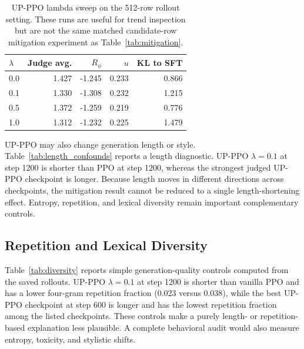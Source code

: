 \documentclass[11pt]{article}
\newcommand{\Rphi}{R_{\phi}}
\begin{document}
\begin{table}[!tbp]
\centering
\scriptsize
\caption{UP-PPO lambda sweep on the 512-row rollout setting. These runs are useful for trend inspection but are not the same matched candidate-row mitigation experiment as Table~\ref{tab:mitigation}.}
\label{tab:lambda_curve}
\begin{tabular}{lrrrr}
\toprule
$\lambda$ & Judge avg. & $\Rphi$ & $u$ & KL to SFT \\
\midrule
0.0 & 1.427 & -1.245 & 0.233 & 0.866 \\
0.1 & 1.330 & -1.308 & 0.232 & 1.215 \\
0.5 & 1.372 & -1.259 & 0.219 & 0.776 \\
1.0 & 1.312 & -1.232 & 0.225 & 1.479 \\
\bottomrule
\end{tabular}
\end{table}

UP-PPO may also change generation length or style. Table~\ref{tab:length_confounds} reports a length diagnostic. UP-PPO $\lambda=0.1$ at step 1200 is shorter than PPO at step 1200, whereas the strongest judged UP-PPO checkpoint is longer. Because length moves in different directions across checkpoints, the mitigation result cannot be reduced to a single length-shortening effect. Entropy, repetition, and lexical diversity remain important complementary controls.

\begin{table}[!tbp]
\centering
\tiny
\caption{Generated-response length diagnostics for selected 64-row checkpoints.}
\label{tab:length_confounds}
\end{table}



\subsection{Repetition and Lexical Diversity}
Table~\ref{tab:diversity} reports simple generation-quality controls computed from the saved rollouts. UP-PPO $\lambda=0.1$ at step 1200 is shorter than vanilla PPO and has a lower four-gram repetition fraction (0.023 versus 0.038), while the best UP-PPO checkpoint at step 600 is longer and has the lowest repetition fraction among the listed checkpoints. These controls make a purely length- or repetition-based explanation less plausible. A complete behavioral audit would also measure entropy, toxicity, and stylistic shifts.
\end{document}

